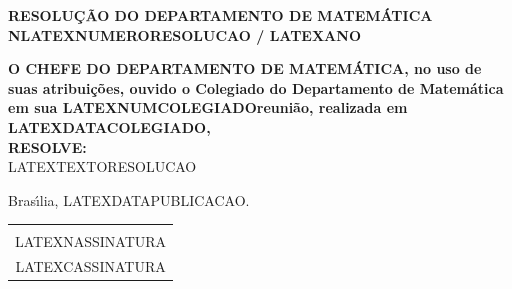 \documentclass[12pt]{artigo}
\begin{document}
\vspace*{.8cm}
\timbrado
\parindent=2cm 
\setlength{\baselineskip}{5mm}
\noindent

\begin{center}
\vspace{12pt}

\textsc{\bf RESOLU\c{C}\~AO DO DEPARTAMENTO DE MATEM\'ATICA N\primo LATEXNUMERORESOLUCAO / LATEXANO}

\end{center}

\vspace{12pt}

\begin{flushright}
\end{flushright}

\vspace{12pt}

\vspace{12pt}

\textbf{O CHEFE DO DEPARTAMENTO DE MATEM\'ATICA, no uso de suas atribui\c{c}\~oes, ouvido o Colegiado do Departamento de Matem\'atica em sua LATEXNUMCOLEGIADO\prima reuni\~ao, realizada em LATEXDATACOLEGIADO,}\\

\textbf{RESOLVE:}\\

LATEXTEXTORESOLUCAO

\vspace{12pt}

\begin{flushright}
Bras{\'\i}lia, LATEXDATAPUBLICACAO.
\end{flushright}


\vspace*{1.0cm} 
\hspace*{5.5cm}
\setlength{\baselineskip}{4mm}
\begin{center}
\begin{tabular}{c}
\hline \vspace*{-3mm}\\
LATEXNASSINATURA \\
{\small LATEXCASSINATURA}
\end{tabular}
\end{center}
\end{document}
